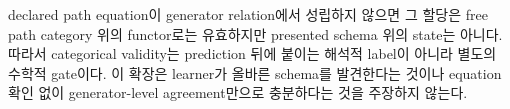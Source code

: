declared path equation이 generator relation에서 성립하지 않으면 그 할당은
free path category 위의 functor로는 유효하지만 presented schema 위의 state는
아니다. 따라서 categorical validity는 prediction 뒤에 붙이는 해석적 label이
아니라 별도의 수학적 gate이다. 이 확장은 learner가 올바른 schema를 발견한다는
것이나 equation 확인 없이 generator-level agreement만으로 충분하다는 것을
주장하지 않는다.
